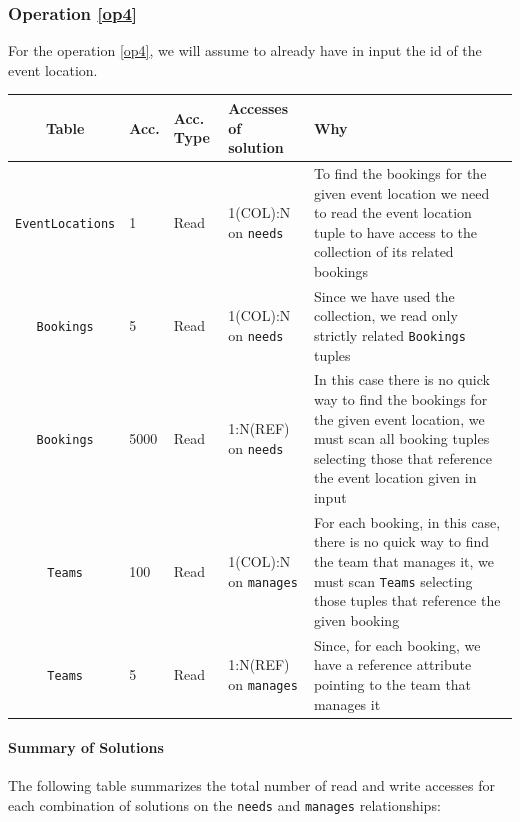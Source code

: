 \subsubsection{Operation \ref{op4}}

For the operation \ref{op4}, we will assume to already have in input the id of the event location.

\begin{longtable}[H]{|c|p{1cm}|p{1cm}|p{2cm}|p{8cm}|}
    \hline
    \textbf{Table} & \textbf{Acc.} & \textbf{Acc. Type} & \textbf{Accesses of solution} & \textbf{Why} \\
    \hline
    \texttt{EventLocations} & 1 & Read & 1(COL):N on \texttt{needs} & To find the bookings for the given event location we need to read the event location tuple to have access to the collection of its related bookings \\
    \hline
    \texttt{Bookings} & 5 & Read & 1(COL):N on \texttt{needs} & Since we have used the collection, we read only strictly related \texttt{Bookings} tuples \\
    \hline
    \texttt{Bookings} & 5000 & Read & 1:N(REF) on \texttt{needs} & In this case there is no quick way to find the bookings for the given event location, we must scan all booking tuples selecting those that reference the event location given in input \\
    \hline
    \texttt{Teams} & 100 & Read & 1(COL):N on \texttt{manages} & For each booking, in this case, there is no quick way to find the team that manages it, we must scan \texttt{Teams} selecting those tuples that reference the given booking \\
    \hline
    \texttt{Teams} & 5 & Read & 1:N(REF) on \texttt{manages} & Since, for each booking, we have a reference attribute pointing to the team that manages it \\
    \hline
\end{longtable}

\paragraph{Summary of Solutions}

The following table summarizes the total number of read and write accesses for each combination of solutions on the \texttt{needs} and \texttt{manages} relationships:

